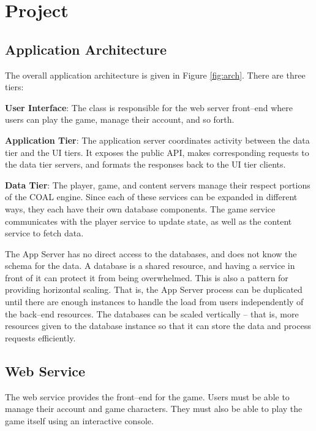 \documentclass{article}
\newcommand{\enterProblemHeader}[1]{
}
\newcommand{\exitProblemHeader}[1]{
\nobreak\extramarks{#1}{}\nobreak
}
\newcounter{homeworkProblemCounter} %
\newcommand{\homeworkProblemName}{}
\newenvironment{homeworkProblem}[1][Problem \arabic{homeworkProblemCounter}]{ %
\stepcounter{homeworkProblemCounter} %
\renewcommand{\homeworkProblemName}{#1} %
\section{\homeworkProblemName} %
\enterProblemHeader{\homeworkProblemName} %
}{
\exitProblemHeader{\homeworkProblemName} %
}
\newcommand{\homeworkSectionName}{}
\newenvironment{homeworkSection}[1]{ %
\renewcommand{\homeworkSectionName}{#1} %
\subsection{\homeworkSectionName} %
\enterProblemHeader{\homeworkProblemName\ [\homeworkSectionName]} %
}{
\enterProblemHeader{\homeworkProblemName} %
}
\begin{document}
\begin{homeworkProblem}[Project]
\begin{homeworkSection}{Application Architecture}
The overall application architecture is given in Figure \ref{fig:arch}. There are three tiers:
\begin{compactitem}
	\item \textbf{User Interface}: The class is responsible for the web server front--end where users can play the game, manage their account, and so forth.
	\item \textbf{Application Tier}: The application server coordinates activity between the data tier and the UI tiers. It exposes the public API, makes corresponding requests to the data tier servers, and formats the responses back to the UI tier clients.
	\item \textbf{Data Tier}: The player, game, and content servers manage their respect portions of the COAL engine. Since each of these services can be expanded in different ways, they each have their own database components. The game service communicates with the player service to update state, as well as the content service to fetch data. 
\end{compactitem}

The App Server has no direct access to the databases, and does not know the schema for the data. A database is a shared resource, and having a service in front of it can protect it from being overwhelmed. This is also a pattern for providing horizontal scaling. That is, the App Server process can be duplicated until there are enough instances to handle the load from users independently of the back--end resources. The databases can be scaled vertically -- that is, more resources given to the database instance so that it can store the data and process requests efficiently.

\end{homeworkSection}


\begin{homeworkSection}{Web Service}
	The web service provides the front--end for the game. Users must be able to manage their account and game characters. They must also be able to play the game itself using an interactive console.
\end{homeworkSection}


\end{homeworkProblem}
\end{document}
